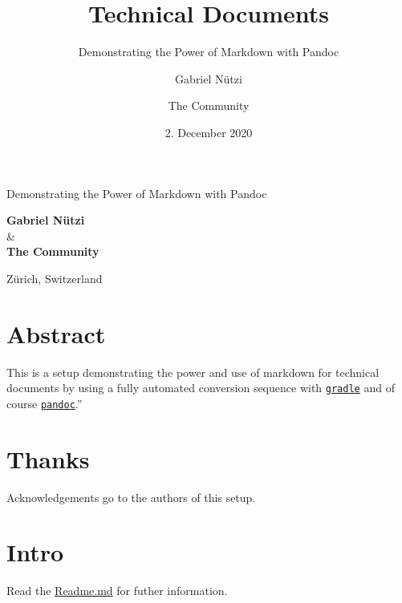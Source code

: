 \documentclass[
  british,
  12pt,
  paper=a4,
  twoside,
  titlepage=true,
  openright,
  abstract=on,
  toc=listofnumbered,
  numbers=noenddot,
  chapterprefix=true,
  headings=optiontohead,
  svgnames,
  dvipsnames]{scrreprt}
\title{Technical Documents}
\subtitle{Demonstrating the Power of Markdown with Pandoc}
\author{Gabriel Nützi \and The Community}
\date{2. December 2020}
\begin{document}
%
%
\begin{titlepage}
\makeatletter
\begin{center}

\end{center}
\vspace{1cm}
\begin{center}
\Huge \textbf{\@title}
\end{center}
\begin{center}
\LARGE Demonstrating the Power of Markdown with Pandoc
\end{center}
\vspace{1cm}
\begin{center}
\textbf{Gabriel Nützi} \\ \& \\ \textbf{The Community}
\end{center}
\begin{center}
\@date
\end{center}
\begin{center}
\vfill
Zürich, Switzerland
\vspace{1cm}
\end{center}
\makeatother
\end{titlepage}%
\cleardoublepage
{}
\pagestyle{scrheadings}
\setcounter{page}{1}
%
\newcommand{\abstracttitle}{Abstract}
\chapter*{\abstracttitle}
\thispagestyle{plain}
This is a setup demonstrating the power and use of markdown for
technical documents by using a fully automated conversion sequence with
\href{https://gradle.org}{\texttt{gradle}} and of course
\href{https://pandoc.org}{\texttt{pandoc}}.”
\cleardoublepage%
\newcommand{\acknowledgementtitle}{Thanks}
\thispagestyle{plain}
\chapter*{\acknowledgementtitle}
Acknowledgements go to the authors of this setup.
\cleardoublepage%
\renewcommand*\contentsname{Contents}
{
\hypersetup{linkcolor=Black}
\tableofcontents
\cleardoublepage
}
%
\cleardoublepage
{}
\hypertarget{intro}{%
\chapter{Intro}\label{intro}}

Read the
\href{https://github.com/gabyx/TechnicalMarkdown/blob/master/Readme.md}{Readme.md}
for futher information.
\end{document}
